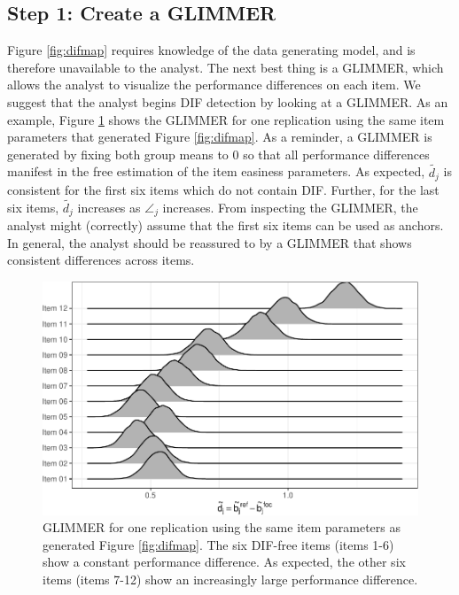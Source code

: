 \documentclass[
  english,
  man,floatsintext]{apa6}
\begin{document}
\hypertarget{step-1-create-a-glimmer}{%
\subsection{Step 1: Create a GLIMMER}\label{step-1-create-a-glimmer}}

Figure \ref{fig:difmap} requires knowledge of the data generating model, and is therefore unavailable to the analyst. The next best thing is a GLIMMER, which allows the analyst to visualize the performance differences on each item. We suggest that the analyst begins DIF detection by looking at a GLIMMER. As an example, Figure \ref{fig:simemmlg} shows the GLIMMER for one replication using the same item parameters that generated Figure \ref{fig:difmap}. As a reminder, a GLIMMER is generated by fixing both group means to 0 so that all performance differences manifest in the free estimation of the item easiness parameters. As expected, \(\tilde{d_j}\) is consistent for the first six items which do not contain DIF. Further, for the last six items, \(\tilde{d_j}\) increases as \(\angle_j\) increases. From inspecting the GLIMMER, the analyst might (correctly) assume that the first six items can be used as anchors. In general, the analyst should be reassured to by a GLIMMER that shows consistent differences across items.

\begin{figure}[h]

{\centering \includegraphics[width=0.7\linewidth]{paper_apa_files/figure-latex/simemmlg-1} 

}

\caption{GLIMMER for one replication using the same item parameters as generated Figure \ref{fig:difmap}. The six DIF-free items (items 1-6) show a constant performance difference. As expected, the other six items (items 7-12) show an increasingly large performance difference.}\label{fig:simemmlg}
\end{figure}
\end{document}
